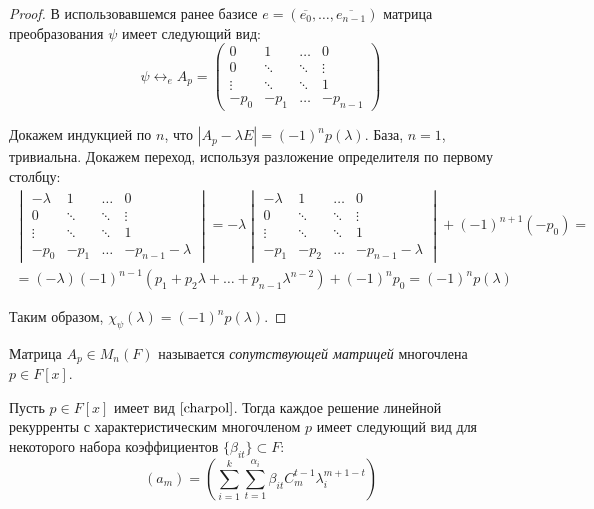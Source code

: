 \begin{proof}
	В использовавшемся ранее базисе $e = (\overline{e_0}, \dots, \overline{e_{n - 1}})$ матрица преобразования $\psi$ имеет следующий вид:
	\[\psi \leftrightarrow_e A_p = \begin{pmatrix}
		0 & 1 & \dots & 0 \\ 
		0 & \ddots & \ddots & \vdots \\ 
		\vdots & \ddots & \ddots & 1 \\ 
		-p_0 & -p_1 & \dots & -p_{n-1}
	\end{pmatrix}\]
	
	Докажем индукцией по $n$, что $|A_p - \lambda E| = (-1)^np(\lambda)$. База, $n = 1$, тривиальна. Докажем переход, используя разложение определителя по первому столбцу:
	\begin{multline*}\begin{vmatrix}
			-\lambda& 1 & \dots & 0 \\ 
			0 & \ddots & \ddots & \vdots \\ 
			\vdots & \ddots & \ddots & 1 \\ 
			-p_0 & -p_1 & \dots & -p_{n-1}-\lambda
		\end{vmatrix} = -\lambda\begin{vmatrix}
			-\lambda& 1 & \dots & 0 \\ 
			0 & \ddots & \ddots & \vdots \\ 
			\vdots & \ddots & \ddots & 1 \\ 
			-p_1 & -p_2 & \dots & -p_{n-1}-\lambda
		\end{vmatrix} + (-1)^{n+1}(-p_0) =\\
		= (-\lambda)(-1)^{n-1}(p_1 + p_2\lambda + \dots + p_{n - 1}\lambda^{n-2}) + (-1)^np_0 = (-1)^np(\lambda)
	\end{multline*}
	
	Таким образом, $\chi_\psi(\lambda) = (-1)^np(\lambda)$.
\end{proof}

\begin{note}
	Матрица $A_p \in M_n(F)$ называется \textit{сопутствующей матрицей} многочлена $p \in F[x]$.
\end{note}

\begin{theorem}
	Пусть $p \in F[x]$ имеет вид $\eqref*{charpol}$. Тогда каждое решение линейной рекурренты с характеристическим многочленом $p$ имеет следующий вид для некоторого набора коэффициентов $\{\beta_{it}\} \subset F$:
	\[(a_m) = \left(\sum_{i = 1}^k\sum_{t = 1}^{\alpha_i}\beta_{it}C_m^{t - 1}\lambda_i^{m + 1 - t}\right)\]
\end{theorem}

